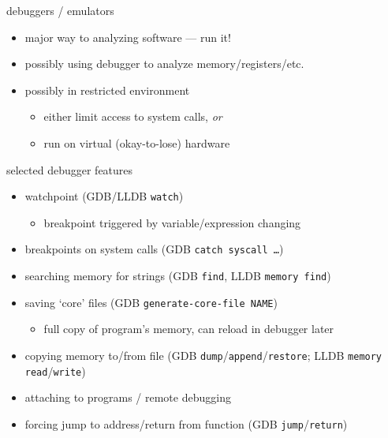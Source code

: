 \begin{frame}{debuggers / emulators}
    \begin{itemize}
    \item major way to analyzing software --- run it!
    \vspace{.5cm}
    \item possibly using debugger to analyze memory/registers/etc.
    \item possibly in restricted environment
        \begin{itemize}
        \item either limit access to system calls, \textit{or}
        \item run on virtual (okay-to-lose) hardware
        \end{itemize}
    \end{itemize}
\end{frame}

\begin{frame}{selected debugger features}
    \begin{itemize}
    \item watchpoint (GDB/LLDB \texttt{watch})
        \begin{itemize}
        \item breakpoint triggered by variable/expression changing
        \end{itemize}
    \item breakpoints on system calls (GDB \texttt{catch syscall \ldots})
    \item searching memory for strings (GDB \texttt{find}, LLDB \texttt{memory find})
    \item saving `core' files (GDB \texttt{generate-core-file NAME})
        \begin{itemize}
        \item full copy of program's memory, can reload in debugger later
        \end{itemize}
    \item copying memory to/from file (GDB \texttt{dump}/\texttt{append}/\texttt{restore}; LLDB \texttt{memory read}/\texttt{write})
    \item attaching to programs / remote debugging
    \item forcing jump to address/return from function (GDB \texttt{jump}/\texttt{return})
    \end{itemize}
\end{frame}

